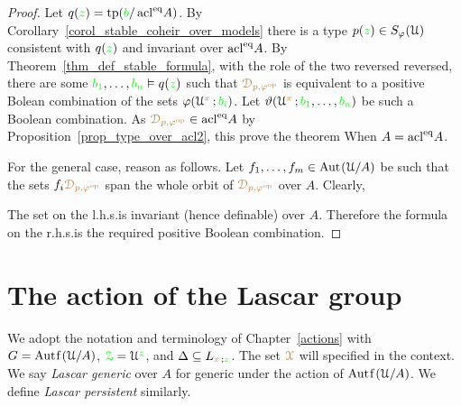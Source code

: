 \begin{proof}
  Let $q({\color{green} z})={\rm tp}({\color{green} b}/\mathop{\rm acl}^{{\rm eq}}\!A)$.
  By Corollary~\ref{corol_stable_coheir_over_models} there is a type $p({\color{green} z})\in S_\varphi(\EuScript U)$ consistent with $q({\color{green} z})$ and invariant over $\mathop{\rm acl}^{{\rm eq}}\!A$.
  By Theorem~\ref{thm_def_stable_formula}, with the role of the two reversed reversed, there are some ${\color{green} b_1},\dots,{\color{green} b_n}\vDash q({\color{green} z})$ such that ${\color{brown}\EuScript D_{p,\varphi^{\rm op}}}$ is equivalent to a positive Bolean combination of the sets $\varphi(\EuScript U^{\color{brown} x}\,;{\color{green} b_i})$.
  Let $\vartheta(\EuScript U^{\color{brown} x}\,;{\color{green} b_1},\dots,{\color{green} b_n})$ be such a Boolean combination.
  As ${\color{brown}\EuScript D_{p,\varphi^{\rm op}}}\in\mathop{\rm acl}^{{\rm eq}}\!A$ by Proposition~\ref{prop_type_over_acl2}, this prove the theorem When $A=\mathop{\rm acl}^{{\rm eq}}\!A$.

  For the general case, reason as follows.
  Let $f_1,\dots,f_m\in{\rm Aut\kern.15ex}(\EuScript U/A)$ be such that the sets $f_i{\color{brown}\EuScript D_{p,\varphi^{\rm op}}}$ span the whole orbit of ${\color{brown}\EuScript D_{p,\varphi^{\rm op}}}$ over $A$.
  Clearly,


  The set on the l.h.s.\@ is invariant (hence definable) over $A$.
  Therefore the formula on the r.h.s.\@ is the required positive Boolean combination.
\end{proof}

\section{The action of the Lascar group}

We adopt the notation and terminology of Chapter~\ref{actions} with $G=\mathord{\rm Aut\kern.15ex{f}\kern.15ex}(\EuScript U/A)$, ${\color{green}\EuScript Z}=\EuScript U^{\color{green} z}$, and $\Delta\subseteq L_{{\color{brown} x}\,;{\color{green} z}}$.
The set ${\color{brown}\EuScript X}$ will specified in the context.
We say \emph{Lascar generic\/} over $A$ for generic under the action of $\mathord{\rm Aut\kern.15ex{f}\kern.15ex}(\EuScript U/A)$.
We define \emph{Lascar persistent\/} similarly.

